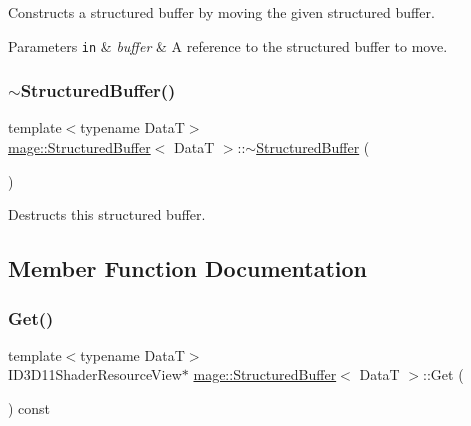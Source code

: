 Constructs a structured buffer by moving the given structured buffer.


\begin{DoxyParams}[1]{Parameters}
\mbox{\tt in}  & {\em buffer} & A reference to the structured buffer to move. \\
\hline
\end{DoxyParams}
\hypertarget{structmage_1_1_structured_buffer_a02ab1d322e1aef0c608b85224b80dbcf}{}\label{structmage_1_1_structured_buffer_a02ab1d322e1aef0c608b85224b80dbcf} 
\subsubsection{\texorpdfstring{$\sim$\+Structured\+Buffer()}{~StructuredBuffer()}}
{\footnotesize\ttfamily template$<$typename DataT$>$ \\
\hyperlink{structmage_1_1_structured_buffer}{mage\+::\+Structured\+Buffer}$<$ DataT $>$\+::$\sim$\hyperlink{structmage_1_1_structured_buffer}{Structured\+Buffer} (\begin{DoxyParamCaption}{ }\end{DoxyParamCaption})\hspace{0.3cm}{\ttfamily [default]}}

Destructs this structured buffer. 

\subsection{Member Function Documentation}
\hypertarget{structmage_1_1_structured_buffer_ad933738bc55b10aea665913a8215bab0}{}\label{structmage_1_1_structured_buffer_ad933738bc55b10aea665913a8215bab0} 
\subsubsection{\texorpdfstring{Get()}{Get()}}
{\footnotesize\ttfamily template$<$typename DataT$>$ \\
I\+D3\+D11\+Shader\+Resource\+View$\ast$ \hyperlink{structmage_1_1_structured_buffer}{mage\+::\+Structured\+Buffer}$<$ DataT $>$\+::Get (\begin{DoxyParamCaption}{ }\end{DoxyParamCaption}) const\hspace{0.3cm}{\ttfamily [noexcept]}}

